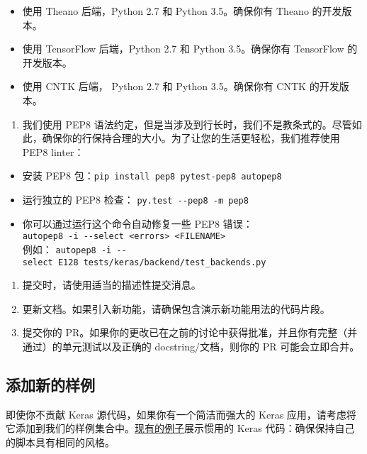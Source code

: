 \begin{itemize}
\tightlist
\item
  使用 Theano 后端，Python 2.7 和 Python 3.5。确保你有 Theano
  的开发版本。
\item
  使用 TensorFlow 后端，Python 2.7 和 Python 3.5。确保你有 TensorFlow
  的开发版本。
\item
  使用 CNTK 后端， Python 2.7 和 Python 3.5。确保你有 CNTK 的开发版本。
\end{itemize}

\begin{enumerate}
\def\labelenumi{\arabic{enumi}.}
\setcounter{enumi}{6}
\tightlist
\item
  我们使用 PEP8
  语法约定，但是当涉及到行长时，我们不是教条式的。尽管如此，确保你的行保持合理的大小。为了让您的生活更轻松，我们推荐使用
  PEP8 linter：
\end{enumerate}

\begin{itemize}
\tightlist
\item
  安装 PEP8 包：\texttt{pip\ install\ pep8\ pytest-pep8\ autopep8}
\item
  运行独立的 PEP8 检查： \texttt{py.test\ -\/-pep8\ -m\ pep8}
\item
  你可以通过运行这个命令自动修复一些 PEP8 错误：\\
  \texttt{autopep8\ -i\ -\/-select\ \textless{}errors\textgreater{}\ \textless{}FILENAME\textgreater{}}\\
  例如：
  \texttt{autopep8\ -i\ -\/-select\ E128\ tests/keras/backend/test\_backends.py}
\end{itemize}

\begin{enumerate}
\def\labelenumi{\arabic{enumi}.}
\setcounter{enumi}{7}
\item
  提交时，请使用适当的描述性提交消息。
\item
  更新文档。如果引入新功能，请确保包含演示新功能用法的代码片段。
\item
  提交你的
  PR。如果你的更改已在之前的讨论中获得批准，并且你有完整（并通过）的单元测试以及正确的
  docstring/文档，则你的 PR 可能会立即合并。
\end{enumerate}



\subsection{添加新的样例}

即使你不贡献 Keras 源代码，如果你有一个简洁而强大的 Keras
应用，请考虑将它添加到我们的样例集合中。\href{https://github.com/keras-team/keras/tree/master/examples}{现有的例子}展示惯用的
Keras 代码：确保保持自己的脚本具有相同的风格。

\newpage
